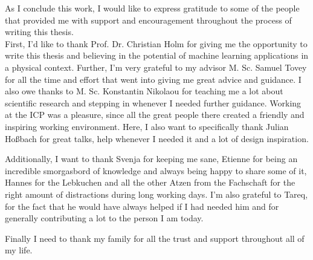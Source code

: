 As I conclude this work, I would like to express gratitude to some of the people that provided me with support and encouragement throughout the process of writing this thesis.\\
First, I'd like to thank Prof. Dr. Christian Holm for giving me the opportunity to write this thesis and believing in the potential of machine learning applications in a physical context. Further, I'm very grateful to my advisor M. Sc. Samuel Tovey for all the time and effort that went into giving me great advice and guidance. I also owe thanks to M. Sc. Konstantin Nikolaou for teaching me a lot about scientific research and stepping in whenever I needed further guidance. Working at the ICP was a pleasure, since all the great people there created a friendly and inspiring working environment. Here, I also want to specifically thank Julian Ho\ss bach for great talks, help whenever I needed it and a lot of design inspiration.\\\par
Additionally, I want to thank Svenja for keeping me sane, Etienne for being an incredible smorgasbord of knowledge and always being happy to share some of it, Hannes for the Lebkuchen and all the other Atzen from the Fachschaft for the right amount of distractions during long working days. I'm also grateful to Tareq, for the fact that he would have always helped if I had needed him and for generally contributing a lot to the person I am today.\\\par
Finally I need to thank my family for all the trust and support throughout all of my life.